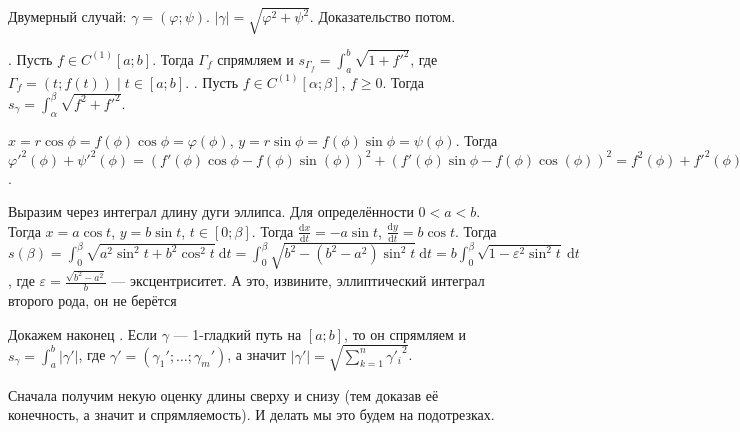 \documentclass{article}
\begin{document}
\begin{itemize}
\begin{Comment}
        \end{Comment}
        \begin{Proof}
            Двумерный случай: $\gamma=(\varphi;\psi)$. $|\gamma|=\sqrt{\varphi^2+\psi^2}$.
            Доказательство потом.
        \end{Proof}
        \thm {}. Пусть $f\in C^{(1)}[a;b]$. Тогда $\Gamma_f$ спрямляем и $s_{\Gamma_f}=\int_a^b\sqrt{1+{f'}^2}$, где $\Gamma_f=(t;f(t))\mid t\in[a;b]$.
        \thm {}. Пусть $f\in C^{(1)}[\alpha;\beta]$, $f\geqslant0$. Тогда $s_\gamma=\int_\alpha^\beta\sqrt{f^2+{f'}^2}$.
        \begin{Proof}
            $x=r\cos\phi=f(\phi)\cos\phi=\varphi(\phi)$, $y=r\sin\phi=f(\phi)\sin\phi=\psi(\phi)$. Тогда ${\varphi'}^2(\phi)+{\psi'}^2(\phi)=(f'(\phi)\cos\phi-f(\phi)\sin(\phi))^2+(f'(\phi)\sin\phi-f(\phi)\cos(\phi))^2=f^2(\phi)+{f'}^2(\phi)$.
        \end{Proof}
        \begin{Example}
            Выразим через интеграл длину дуги эллипса. Для определённости $0<a<b$. Тогда $x=a\cos t$, $y=b\sin t$, $t\in[0;\beta]$. Тогда $\frac{\mathrm dx}{\mathrm dt}=-a\sin t$, $\frac{\mathrm dy}{\mathrm dt}=b\cos t$. Тогда $s(\beta)=\int_0^\beta\sqrt{a^2\sin^2t+b^2\cos^2t}~\mathrm dt=\int_0^\beta\sqrt{b^2-(b^2-a^2)\sin^2t}~\mathrm dt=b\int_0^\beta\sqrt{1-\varepsilon^2\sin^2t}~\mathrm dt$, где $\varepsilon=\frac{\sqrt{b^2-a^2}}b$ --- эксцентриситет. А это, извините, эллиптический интеграл второго рода, он не берётся
        \end{Example}
        \thm Докажем наконец . Если $\gamma$ --- 1-гладкий путь на $[a;b]$, то он спрямляем и $s_\gamma=\int_a^b|\gamma'|$, где $\gamma'=(\gamma_1';\ldots;\gamma_m')$, а значит $|\gamma'|=\sqrt{\sum\limits_{k=1}^n{\gamma'_i}^2}$.
        \begin{Proof}
            Сначала получим некую оценку длины сверху и снизу (тем доказав её конечность, а значит и спрямляемость). И делать мы это будем на подотрезках.\\

\end{Proof}
\end{itemize}
\end{document}
